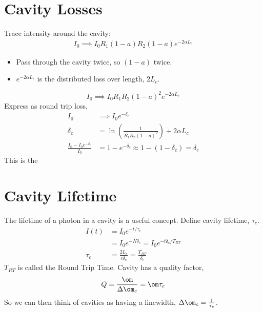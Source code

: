 \documentclass[a4paper, 11pt, normalem]{report}
\begin{document}
\section{Cavity Losses}
Trace intensity around the cavity:
\begin{align}
    I_0 \implies I_0R_1(1-a)R_2(1-a)e^{-2\alpha L_c}
\end{align}
\begin{multicols}{2}
\begin{itemize}
    \item Pass through the cavity twice, so $(1-a)$ twice. 
    \item $e^{-2\alpha L_c}$ is the distributed loss over length, $2L_c$.
\end{itemize}
\end{multicols}
\begin{equation}
    I_0 \implies I_0R_1R_2(1-a)^2e^{-2\alpha L_c}
\end{equation}
Express as round trip loss,
\begin{align}
    I_0 &\implies I_0e^{-\delta_c} \\
    \delta_c &= \ln\left(\frac{1}{R_1R_2(1-a)^2}\right)+2\alpha L_c \\
    \frac{I_0-I_0e^{-\delta_c}}{I_0} &= 1 - e^{-\delta_c} \approx 1-(1-\delta_c) = \delta_c
\end{align}
This is the 

\section{Cavity Lifetime}
The lifetime of a photon in a cavity is a useful concept. 
Define cavity lifetime, $\tau_c$.
\begin{align}
    I(t) &= I_0e^{-t/\tau_c} \\
         &= I_0e^{-N\delta_c} = I_0e^{-t\delta_c/T_{RT}} \\
    \tau_c &= \frac{2L_c}{c\delta_c} = \frac{T_{RT}}{\delta_c}
\end{align}
$T_{RT}$ is called the Round Trip Time.
Cavity has a quality factor, 
\begin{align}
    Q = \frac{\om}{\Delta\om_c} = \om\tau_c
\end{align}
So we can then think of cavities as having a linewidth, $\Delta\om_c = \frac{1}{\tau_c}$.
\end{document}
